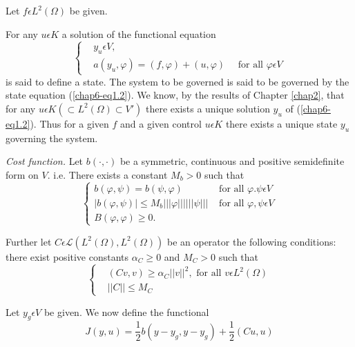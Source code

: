 Let $f \epsilon L^{2} (\Omega)$ be given.

For any $u \epsilon K$ a solution of the functional equation
\begin{equation*}
\begin{cases}
& y_{u} \epsilon V,\\
& a(y_{u}, \varphi) = (f, \varphi) + (u, \varphi) \quad \text{ for all } \varphi \epsilon V\tag{1.2}\label{chap6-eq1.2}
\end{cases}
\end{equation*}
is said to define a state. The system to be governed is said to be
governed by the state equation (\ref{chap6-eq1.2}). We know, by the
results of Chapter \ref{chap2}, that for any $u \epsilon K (\subset
L^{2} (\Omega) \subset V')$ there exists a unique solution $y_{u}$ of
(\ref{chap6-eq1.2}). Thus for a given $f$ and a given control $u
\epsilon K$ there exists a unique state $y_{u}$ governing the system. 

{\em Cost function.} Let $b(\cdot , \cdot)$ be a symmetric, continuous
and positive semidefinite form on $V$. i.e. There exists a constant
$M_{b} > 0$ such that  
\begin{equation*}
\begin{cases}
 b (\varphi, \psi) = b(\psi, \varphi) & \text{ for all } \varphi. \psi \epsilon V\\
 |b(\varphi, \psi)| \leq M_{b} |||\varphi||| |||\psi||| & \text{ for all } \varphi, \psi \epsilon V\\
 B(\varphi, \varphi) \geq 0. &   \tag{1.3}\label{chap6-eq1.3}
\end{cases}
\end{equation*}\pageoriginale

Further let $C \epsilon \mathscr{L} (L^{2} (\Omega), L^{2} (\Omega))$ be an operator the following conditions: there exist positive constants $\alpha_{C} \geq 0$ and $M_{C} > 0$ such that
\begin{equation*}
\begin{cases}
& (Cv, v) \geq \alpha_{C} ||v||^{2}, \text{ for all } v \epsilon L^{2} (\Omega)\\
& ||C|| \leq M_{C}\tag{1.4}\label{chap6-eq1.4}
\end{cases}
\end{equation*}

Let $y_{g} \epsilon V$ be given. We now define the functional
\begin{equation*}
J(y, u) = \frac{1}{2} b(y - y_{g}, y-y_{g}) + \frac{1}{2} (Cu, u)\tag{1.5}\label{chap6-eq1.5}
\end{equation*}

